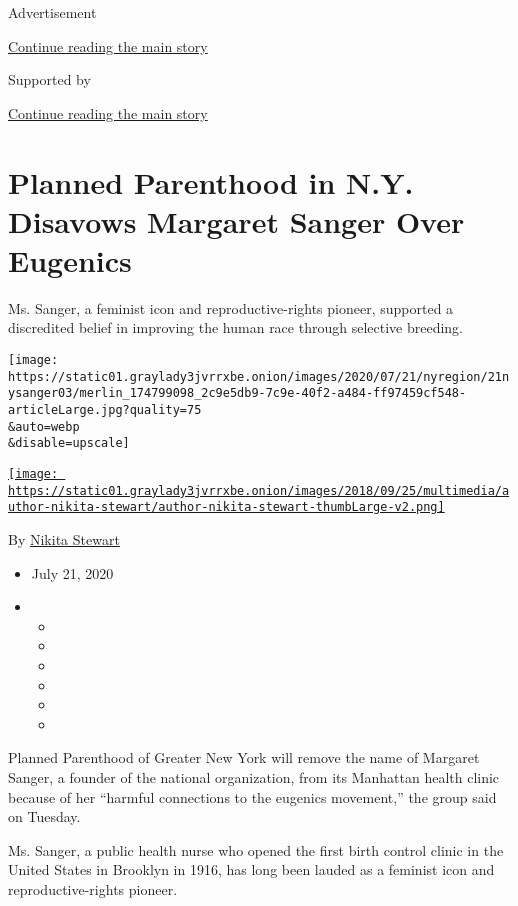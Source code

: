 Advertisement

\protect\hyperlink{after-top}{Continue reading the main story}

Supported by

\protect\hyperlink{after-sponsor}{Continue reading the main story}

\hypertarget{planned-parenthood-in-ny-disavows-margaret-sanger-over-eugenics}{%
\section{Planned Parenthood in N.Y. Disavows Margaret Sanger Over
Eugenics}\label{planned-parenthood-in-ny-disavows-margaret-sanger-over-eugenics}}

Ms. Sanger, a feminist icon and reproductive-rights pioneer, supported a
discredited belief in improving the human race through selective
breeding.

\texttt{[image: https://static01.graylady3jvrrxbe.onion/images/2020/07/21/nyregion/21nysanger03/merlin\_174799098\_2c9e5db9-7c9e-40f2-a484-ff97459cf548-articleLarge.jpg?quality=75\\\&auto=webp\\\&disable=upscale]}

\href{https://www.nytimes3xbfgragh.onion/by/nikita-stewart}{\texttt{[image: https://static01.graylady3jvrrxbe.onion/images/2018/09/25/multimedia/author-nikita-stewart/author-nikita-stewart-thumbLarge-v2.png]}}

By \href{https://www.nytimes3xbfgragh.onion/by/nikita-stewart}{Nikita
Stewart}

\begin{itemize}
\item
  July 21, 2020
\item
  \begin{itemize}
  \item
  \item
  \item
  \item
  \item
  \item
  \end{itemize}
\end{itemize}

Planned Parenthood of Greater New York will remove the name of Margaret
Sanger, a founder of the national organization, from its Manhattan
health clinic because of her ``harmful connections to the eugenics
movement,'' the group said on Tuesday.

Ms. Sanger, a public health nurse who opened the first birth control
clinic in the United States in Brooklyn in 1916, has long been lauded as
a feminist icon and reproductive-rights pioneer.


